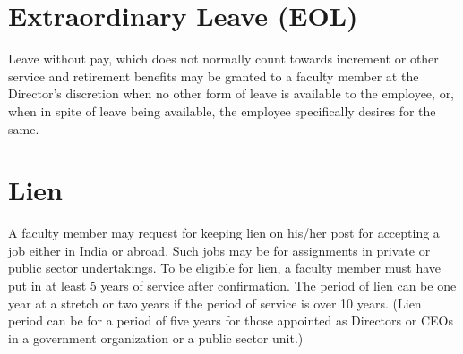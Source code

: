 \documentclass[
  10pt,
  a5paper,
  10pt,
  openany]{amsbook}
\begin{document}
\section{Extraordinary Leave (EOL)}\label{extraordinary-leave-eol}

Leave without pay, which does not normally count towards increment or
other service and retirement benefits may be granted to a faculty member
at the Director's discretion when no other form of leave is available to
the employee, or, when in spite of leave being available, the employee
specifically desires for the same.

\section{Lien}\label{lien}

A faculty member may request for keeping lien on his/her post for
accepting a job either in India or abroad. Such jobs may be for
assignments in private or public sector undertakings. To be eligible for
lien, a faculty member must have put in at least 5 years of service
after confirmation. The period of lien can be one year at a stretch or
two years if the period of service is over 10 years. (Lien period can be
for a period of five years for those appointed as Directors or CEOs in a
government organization or a public sector unit.)
\end{document}
